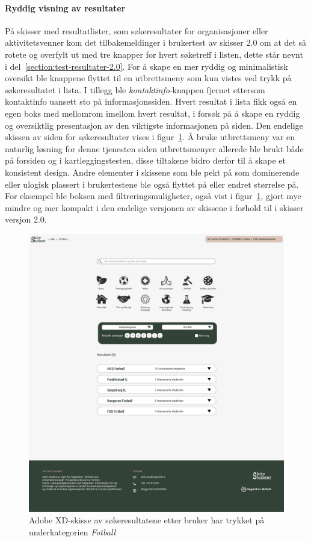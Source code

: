 \paragraph{Ryddig visning av resultater}
På skisser med resultatlister, som søkeresultater for organisasjoner eller aktivitetsvenner kom det tilbakemeldinger i brukertest av skisser 2.0 om at det så rotete og overfylt ut med tre knapper for hvert søketreff i listen, dette står nevnt i del~\ref{section:test-resultater-2.0}. For å skape en mer ryddig og minimalistisk oversikt ble knappene flyttet til en utbrettsmeny som kun vistes ved trykk på søkeresultatet i lista. I tillegg ble {\em kontaktinfo}-knappen fjernet ettersom kontaktinfo uansett sto på informasjonssiden. Hvert resultat i lista fikk også en egen boks med mellomrom imellom hvert resultat, i forsøk på å skape en ryddig og oversiktlig presentasjon av den viktigste informasjonen på siden. Den endelige skissen av siden for søkeresultater vises i figur~\ref{fig:3-3-resultater-filtrering}. Å bruke utbrettsmeny var en naturlig løsning for denne tjenesten siden utbrettsmenyer allerede ble brukt både på forsiden og i kartleggingstesten, disse tiltakene bidro derfor til å skape et konsistent design. Andre elementer i skissene som ble pekt på som dominerende eller ulogisk plassert i brukertestene ble også flyttet på eller endret størrelse på. For eksempel ble boksen med filtreringsmuligheter, også vist i figur~\ref{fig:3-3-resultater-filtrering}, gjort mye mindre og mer kompakt i den endelige versjonen av skissene i forhold til i skisser versjon 2.0. 


\begin{figure}[H]
\centering
\includegraphics[width=.7\textwidth]{Illustrasjoner/Skisser-pdf/3.0/3-3-resultater-fotball.pdf}
\caption{Adobe XD-skisse av søkeresultatene etter bruker har trykket på underkategorien {\em Fotball}}
\label{fig:3-3-resultater-filtrering}
\end{figure}

